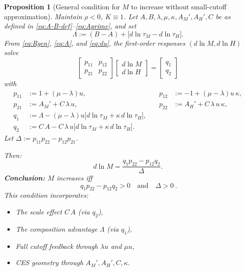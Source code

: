 \documentclass[english]{article}
\newtheorem{proposition}{Proposition}
\begin{document}
\begin{proposition}[General condition for $M$ to increase without small-cutoff approximation]\label{prop:M_increase_general}
Maintain $\rho<0$, $K\equiv 1$.  
Let $A,B,\lambda,\mu,\kappa,A_M',A_H',C$ be as defined in \eqref{eq:A-B-def}–\eqref{eq:Aprime}, and set
\[
\Lambda := (B-A) + \big[d\ln\tau_M - d\ln\tau_H\big].
\]
From \eqref{eq:Rgen}, \eqref{eq:A}, and \eqref{eq:du}, the first-order responses $(d\ln M,d\ln H)$ solve
\[
\begin{bmatrix}
p_{11} & p_{12} \\
p_{21} & p_{22}
\end{bmatrix}
\begin{bmatrix}
d\ln M \\[2pt]
d\ln H
\end{bmatrix}
=
\begin{bmatrix}
q_{1} \\[2pt]
q_{2}
\end{bmatrix}
\]
with
\begin{align*}
p_{11} &:= 1+(\mu-\lambda)u, 
&\quad p_{12} &:= -1+(\mu-\lambda)u\,\kappa, \\
p_{21} &:= A_M' + C\,\lambda\,u, 
&\quad p_{22} &:= A_H' + C\,\lambda\,u\,\kappa, \\
q_{1}  &:= \Lambda - (\mu-\lambda)u\big[d\ln\tau_M+\kappa\,d\ln\tau_H\big], \\
q_{2}  &:= C\,A - C\,\lambda\,u\big[d\ln \tau_M + \kappa\,d\ln \tau_H\big].
\end{align*}
Let $\Delta := p_{11}p_{22} - p_{12}p_{21}$.

Then:
\[
d\ln M = \frac{q_{1} p_{22} - p_{12} q_{2}}{\Delta}.
\]
\smallskip
\noindent
\textbf{Conclusion:} $M$ increases iff
\[
\boxed{\ q_{1} p_{22} - p_{12} q_{2} > 0 \quad\text{and}\quad \Delta>0\ }.
\]
This condition incorporates:
\begin{itemize}
\item The \emph{scale effect} $C\,A$ (via $q_{2}$),
\item The \emph{composition advantage} $\Lambda$ (via $q_{1}$),
\item Full cutoff feedback through $\lambda u$ and $\mu u$,
\item CES geometry through $A_M',A_H',C,\kappa$.
\end{itemize}
\end{proposition}
\end{document}
